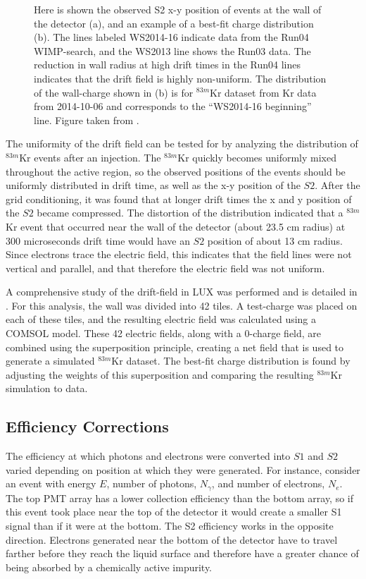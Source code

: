 \begin{figure}[!h]
\begin{subfigure}{0.5\linewidth}
\caption{}
\end{subfigure}
\caption{Here is shown the observed S2 x-y position of events at the wall of the detector (a), and an example of a best-fit charge distribution (b). The lines labeled WS2014-16 indicate data from the Run04 WIMP-search, and the WS2013 line shows the Run03 data. The reduction in wall radius at high drift times in the Run04 lines indicates that the drift field is highly non-uniform. The distribution of the wall-charge shown in (b) is for $^{83m}$Kr dataset from Kr data from 2014-10-06 and corresponds to the ``WS2014-16 beginning'' line. Figure taken from \cite{lux_efield}.}
\label{fig:lux_layout} 
\end{figure}

The uniformity of the drift field can be tested for by analyzing the distribution of $^{83m}$Kr events after an injection. The $^{83m}$Kr quickly becomes uniformly mixed throughout the active region, so the observed positions of the events should be uniformly distributed in drift time, as well as the x-y position of the $S2$. After the grid conditioning, it was found that at longer drift times the x and y position of the $S2$ became compressed. The distortion of the distribution indicated that a $^{83m}$Kr event that occurred near the wall of the detector (about 23.5 cm radius) at 300 microseconds drift time would have an $S2$ position of about 13 cm radius. Since electrons trace the electric field, this indicates that the field lines were not vertical and parallel, and that therefore the electric field was not uniform.

A comprehensive study of the drift-field in LUX was performed and is detailed in \cite{lux_efield}. For this analysis, the wall was divided into 42 tiles. A test-charge was placed on each of these tiles, and the resulting electric field was calculated using a COMSOL model. These 42 electric fields, along with a 0-charge field, are combined using the superposition principle, creating a net field that is used to generate a simulated $^{83m}$Kr dataset. The best-fit charge distribution is found by adjusting the weights of this superposition and comparing the resulting $^{83m}$Kr simulation to data.
 
 \subsection{Efficiency Corrections}\label{sec:krypcal}
The efficiency at which photons and electrons were converted into $S1$ and $S2$ varied depending on position at which they were generated. For instance, consider an event with energy $E$, number of photons, $N_{\gamma}$, and number of electrons, $N_e$. The top PMT array has a lower collection efficiency than the bottom array, so if this event took place near the top of the detector it would create a smaller S1 signal than if it were at the bottom. The S2 efficiency works in the opposite direction. Electrons generated near the bottom of the detector have to travel farther before they reach the liquid surface and therefore have a greater chance of being absorbed by a chemically active impurity. 

